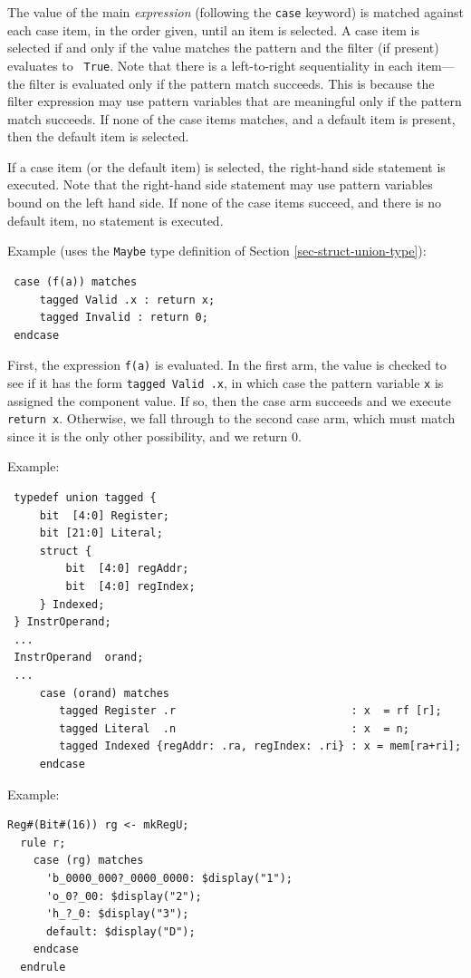 \documentclass[twoside,letterpaper]{article}
\newcommand{\nterm}[1]{\emph{#1}}
\begin{document}
The value of the main \nterm{expression} (following the \texttt{case}
keyword) is matched against each case item, in the order given, until
an item is selected.  A case item is selected if and only if the value
matches the pattern and the filter (if present) evaluates to {\tt
True}.  Note that there is a left-to-right sequentiality in each
item--- the filter is evaluated only if the pattern match succeeds.
This is because the filter expression may use pattern variables that
are meaningful only if the pattern match succeeds.  If none of the
case items matches, and a default item is present, then the default
item is selected.

If a case item (or the default item) is selected, the right-hand side
statement is executed.  Note that the right-hand side statement may
use pattern variables bound on the left hand side.  If none of the
case items succeed, and there is no default item, no statement is
executed.

Example (uses the \texttt{Maybe} type definition of Section
{\ref{sec-struct-union-type}}):
\begin{verbatim}
 case (f(a)) matches
     tagged Valid .x : return x;
     tagged Invalid : return 0;
 endcase
\end{verbatim}
First, the expression \texttt{f(a)} is evaluated.  In the first arm, the
value is checked to see if it has the form {\mbox{\texttt{tagged Valid
.x}}}, in which case the pattern variable \texttt{x} is assigned the
component value.  If so, then the case arm succeeds and we execute
\texttt{return~x}.  Otherwise, we fall through to the second case arm,
which must match since it is the only other possibility, and we return
0.

Example:
\begin{verbatim}
 typedef union tagged {
     bit  [4:0] Register;
     bit [21:0] Literal;
     struct {
         bit  [4:0] regAddr;
         bit  [4:0] regIndex;
     } Indexed;
 } InstrOperand;
 ...
 InstrOperand  orand;
 ...
     case (orand) matches
        tagged Register .r                           : x  = rf [r];
        tagged Literal  .n                           : x  = n;
        tagged Indexed {regAddr: .ra, regIndex: .ri} : x = mem[ra+ri];
     endcase
\end{verbatim}

Example:
\begin{verbatim}
Reg#(Bit#(16)) rg <- mkRegU;
  rule r;
    case (rg) matches
      'b_0000_000?_0000_0000: $display("1");
      'o_0?_00: $display("2");
      'h_?_0: $display("3");
      default: $display("D");
    endcase
  endrule
\end{verbatim}
\end{document}
